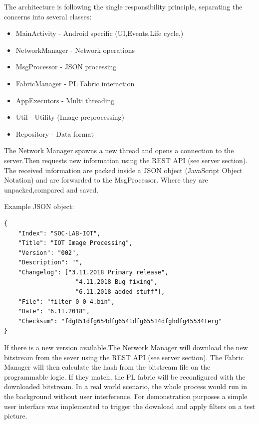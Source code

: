 The architecture is following the single responsibility principle, separating the concerns into several classes:

\begin{itemize}
    \item MainActivity 	    - Android specific (UI,Events,Life cycle,)
    \item NetworkManager	- Network operations 
    \item MsgProcessor	    - JSON processing 
    \item FabricManager	    - PL Fabric interaction
    \item AppExecutors	    - Multi threading
    \item Util			    - Utility (Image preprocessing)
    \item Repository        - Data format
\end{itemize}


The Network Manager spawns a new thread and opens a connection to the server.Then requests new information using the REST API (see server section). The received information are packed inside a JSON object (JavaScript Object Notation) and are forwarded to the MsgProcessor. Where they are unpacked,compared and saved.

Example JSON object:
\begin{verbatim}
{
    "Index": "SOC-LAB-IOT",
    "Title": "IOT Image Processing",
    "Version": "002",
    "Description": "",
    "Changelog": ["3.11.2018 Primary release", 
                    "4.11.2018 Bug fixing", 
                    "6.11.2018 added stuff"],
    "File": "filter_0_0_4.bin",
    "Date": "6.11.2018",
    "Checksum": "fdg851dfg654dfg6541dfg65514dfghdfg45534terg"
}  
\end{verbatim}



If there is a new version available.The Network Manager will download the new bitstream from the sever using the REST API (see server section). The Fabric Manager will then calculate the hash from the bitstream file on the programmable logic. If they match, the PL fabric will be reconfigured with the downloaded bitstream. In a real world scenario, the whole process would run in the background without user interference. For demonstration purposes a simple user interface was implemented to trigger the download and apply filters on a test picture.

